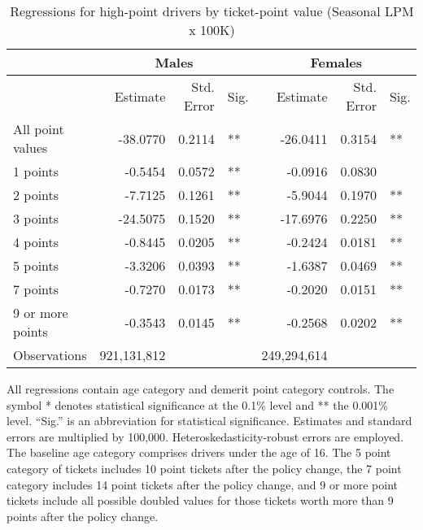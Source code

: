 
\begin{table}%
\centering 
\begin{tabular}{l r r l r r l} 

\hline 
 
 & \multicolumn{3}{c}{Males} & \multicolumn{3}{c}{Females} \\ 

\hline 
 
 & Estimate & Std. Error & Sig. & Estimate & Std. Error & Sig. \\ 

\hline 
 
All point values                &  -38.0770        &  0.2114       &   **       &  -26.0411        &  0.3154       &   **       \\ 
1 points                        &  -0.5454        &  0.0572       &   **       &  -0.0916        &  0.0830       &            \\ 
2 points                        &  -7.7125        &  0.1261       &   **       &  -5.9044        &  0.1970       &   **       \\ 
3 points                        &  -24.5075        &  0.1520       &   **       &  -17.6976        &  0.2250       &   **       \\ 
4 points                        &  -0.8445        &  0.0205       &   **       &  -0.2424        &  0.0181       &   **       \\ 
5 points                        &  -3.3206        &  0.0393       &   **       &  -1.6387        &  0.0469       &   **       \\ 
7 points                        &  -0.7270        &  0.0173       &   **       &  -0.2020        &  0.0151       &   **       \\ 
9 or more points                &  -0.3543        &  0.0145       &   **       &  -0.2568        &  0.0202       &   **       \\ 
Observations            & 921,131,812    &          &              &  249,294,614 \\ 


\hline 

\end{tabular} 
\caption{Regressions for high-point drivers by ticket-point value (Seasonal LPM x 100K)} 
All regressions contain age category and demerit point category controls. 
The symbol * denotes statistical significance at the 0.1\% level 
and ** the 0.001\% level. 
``Sig.'' is an abbreviation for statistical significance. 
Estimates and standard errors are multiplied by 100,000. 
Heteroskedasticity-robust errors are employed. 
The baseline age category comprises drivers under the age of 16. 
The 5 point category of tickets includes 10 point tickets after the policy change,  
the 7 point category includes 14 point tickets after the policy change,  
and 9 or more point tickets include all possible doubled values for those tickets  
worth more than 9 points after the policy change. 
\label{tab:seas_LPMx100K_regs_by_points} 
\end{table} 
 
